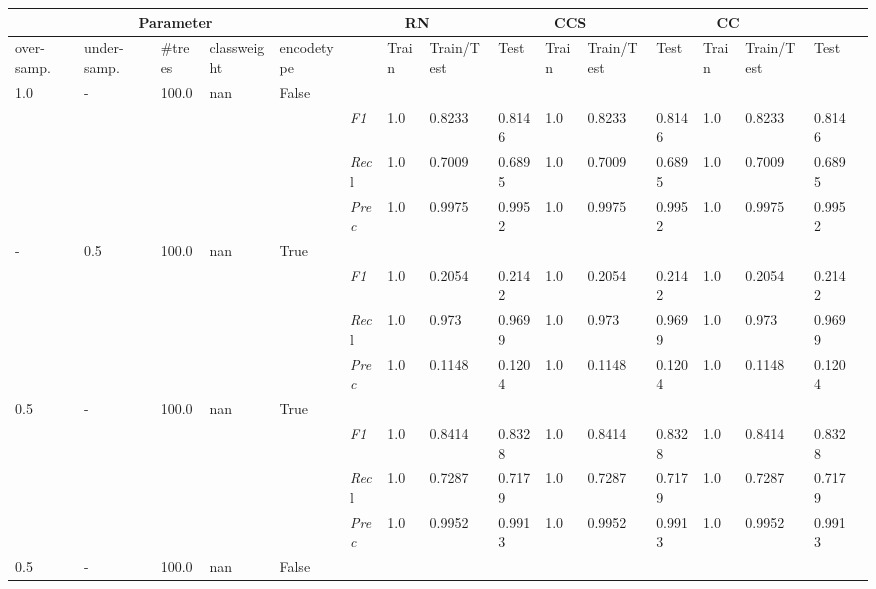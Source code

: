 \begin{table}[]
\tiny
\tabcolsep=0.11cm
\begin{tabularx}{\textwidth}{XXXXX|X|XXX|XXX|XXXX}
\toprule
\multicolumn{5}{c}{Parameter} & \multicolumn{3}{c}{RN} & \multicolumn{3}{c}{CCS} & \multicolumn{3}{c}{CC} \\ \midrule
over-\newline samp. & under-\newline samp. & \#trees & class\newline weight & encode\newline type & & Train & Train/\newline Test & Test & Train & Train/\newline Test & Test & Train & Train/\newline Test & Test \\ \midrule
1.0 & - & 100.0 & nan & False& & & & & & & & & \\
& & & & & \textit{F1} & 1.0 & 0.8233 & 0.8146 & 1.0 & 0.8233        & 0.8146        & 1.0        & 0.8233        & 0.8146        \\
& & & & & \textit{Rec}l & 1.0 & 0.7009 & 0.6895    & 1.0 & 0.7009    & 0.6895    & 1.0    & 0.7009    & 0.6895    \\
& & & & & \textit{Prec} & 1.0 & 0.9975 & 0.9952 & 1.0 & 0.9975 & 0.9952 & 1.0 & 0.9975 & 0.9952 \\ \midrule
- & 0.5 & 100.0 & nan & True& & & & & & & & & \\
& & & & & \textit{F1} & 1.0 & 0.2054 & 0.2142 & 1.0 & 0.2054        & 0.2142        & 1.0        & 0.2054        & 0.2142        \\
& & & & & \textit{Rec}l & 1.0 & 0.973 & 0.9699    & 1.0 & 0.973    & 0.9699    & 1.0    & 0.973    & 0.9699    \\
& & & & & \textit{Prec} & 1.0 & 0.1148 & 0.1204 & 1.0 & 0.1148 & 0.1204 & 1.0 & 0.1148 & 0.1204 \\ \midrule
0.5 & - & 100.0 & nan & True& & & & & & & & & \\
& & & & & \textit{F1} & 1.0 & 0.8414 & 0.8328 & 1.0 & 0.8414        & 0.8328        & 1.0        & 0.8414        & 0.8328        \\
& & & & & \textit{Rec}l & 1.0 & 0.7287 & 0.7179    & 1.0 & 0.7287    & 0.7179    & 1.0    & 0.7287    & 0.7179    \\
& & & & & \textit{Prec} & 1.0 & 0.9952 & 0.9913 & 1.0 & 0.9952 & 0.9913 & 1.0 & 0.9952 & 0.9913 \\ \midrule
0.5 & - & 100.0 & nan & False& & & & & & & & & \\

\end{tabularx}
\end{table}
